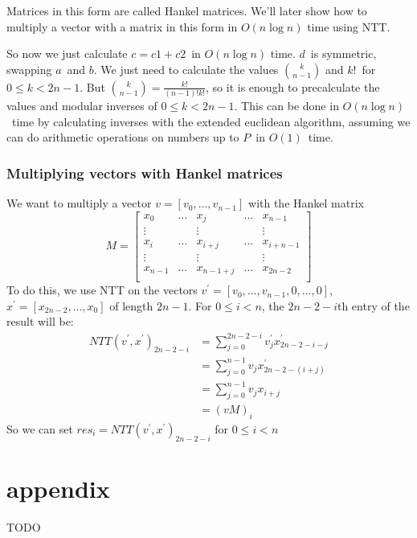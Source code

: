\documentclass{article}
\begin{document}
Matrices in this form are called Hankel matrices. We'll later show how to multiply a vector with a matrix in this form in $O(n \log n)$ time using NTT.

So now we just calculate $c = c1 + c2$ in $O(n \log n)$ time. $d$ is symmetric, swapping $a$ and $b$. We just need to calculate the values
$\binom{k}{n-1}$ and $k!$ for $0 \leq k < 2n-1$. But $\binom{k}{n-1} = \frac{k!}{(n-1)!k!}$, so it is enough to precalculate the values and modular inverses
of $0 \leq k < 2n-1$. This can be done in $O(n \log n)$ time by calculating inverses with the extended euclidean algorithm, assuming we can do arithmetic
operations on numbers up to $P$ in $O(1)$ time.

\subsubsection{Multiplying vectors with Hankel matrices}
We want to multiply a vector $v = [v_{0}, \dots, v_{n-1}]$ with the Hankel matrix
\begin{equation*}
M = \left[\begin{array}{ccccc}
	x_{0}	&\dots	&x_{j}		&\dots	&x_{n-1}\\
	\vdots	&	&\vdots		&	&\vdots\\
	x_{i}	&\dots	&x_{i+j}	&\dots	&x_{i+n-1}\\
	\vdots	&	&\vdots		&	&\vdots\\
	x_{n-1}	&\dots	&x_{n-1+j}	&\dots	&x_{2n-2}\\
	\end{array}\right]
\end{equation*}
To do this, we use NTT on the vectors $v^{'} = [v_{0}, \dots, v_{n-1}, 0, \dots, 0]$, $x^{'} = [x_{2n-2}, \dots, x_{0}]$
of length $2n-1$. For $0 \leq i < n$, the $2n-2-i$th entry of the result will be:
\begin{align*}
NTT(v^{'}, x^{'})_{2n-2-i}	&= \sum_{j = 0}^{2n-2-i} v^{'}_{j} x^{'}_{2n-2-i-j}\\
				&= \sum_{j = 0}^{n-1} v_{j} x^{'}_{2n-2 - (i+j)}\\
				&= \sum_{j = 0}^{n-1} v_{j} x_{i+j}\\
				&= (vM)_{i}
\end{align*}
So we can set $res_{i} = NTT(v^{'}, x^{'})_{2n-2-i}$ for $0 \leq i < n$

\section{appendix}
TODO
\end{document}
